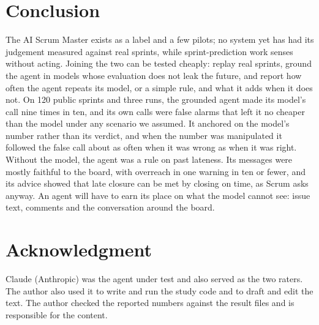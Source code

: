 \documentclass[conference]{IEEEtran}
\begin{document}
\section{Conclusion}

The AI Scrum Master exists as a label and a few pilots; no system yet has had its judgement measured against real sprints, while sprint-prediction work senses without acting. Joining the two can be tested cheaply: replay real sprints, ground the agent in models whose evaluation does not leak the future, and report how often the agent repeats its model, or a simple rule, and what it adds when it does not. On 120 public sprints and three runs, the grounded agent made its model's call nine times in ten, and its own calls were false alarms that left it no cheaper than the model under any scenario we assumed. It anchored on the model's number rather than its verdict, and when the number was manipulated it followed the false call about as often when it was wrong as when it was right. Without the model, the agent was a rule on past lateness. Its messages were mostly faithful to the board, with overreach in one warning in ten or fewer, and its advice showed that late closure can be met by closing on time, as Scrum asks anyway. An agent will have to earn its place on what the model cannot see: issue text, comments and the conversation around the board.

\section*{Acknowledgment}
Claude (Anthropic) was the agent under test and also served as the two raters. The author also used it to write and run the study code and to draft and edit the text. The author checked the reported numbers against the result files and is responsible for the content.
\end{document}
